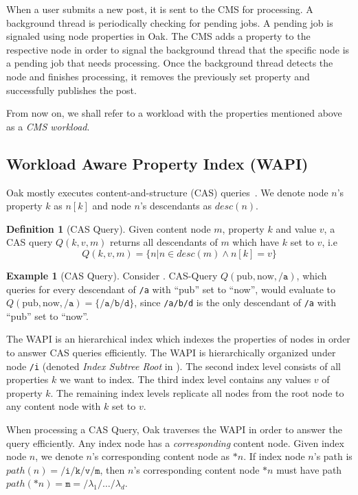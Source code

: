 \documentclass[abstracton,12pt]{scrartcl}
\theoremstyle{definition}
\newtheorem{definition}{Definition}
\newtheorem{example}{Example}
\begin{document}
When a user submits a new post, it is sent to the CMS for processing. A
background thread is periodically checking for pending jobs. A pending job is
signaled using node properties in Oak.
The CMS adds a property to the respective node  in
order to signal the background thread that the specific node is a pending job that needs
processing. Once the
background thread detects the node and finishes processing, it removes the
previously set property and
successfully publishes the post.

From now on, we shall refer to a workload with the properties mentioned above as
a \textit{CMS workload}.

\subsection{Workload Aware Property Index (WAPI)}
\label{sec:wapi}

Oak mostly executes content-and-structure (CAS) queries~\cite{CM15}.
We denote node $n$'s property $k$ as $n[k]$ and node $n$'s descendants as
$desc(n)$.

\begin{definition}[CAS Query]
  Given content node $m$, property $k$ and value $v$, a CAS query
  $Q(k,v,m)$ returns all descendants of $m$ which have $k$ set to $v$, i.e
  $$ Q(k,v,m) = \{ n | n \in desc(m) \land n[k] = v\} $$
\end{definition}

\begin{example}[CAS Query]
  Consider . CAS-Query $Q(\text{pub},\text{now},\texttt{/a})$,
  which queries for every descendant of \texttt{/a} with
  ``pub'' set to ``now'', would evaluate to $Q(\text{pub},\text{now},\texttt{/a}) = \{\texttt{/a/b/d}\}$,
  since \texttt{/a/b/d} is the only descendant of \texttt{/a} with ``pub'' set
  to ``now''.
  \label{ex:cas_query}
\end{example}

The WAPI is an hierarchical index which indexes the properties of nodes in order
to answer CAS queries efficiently.
The WAPI is hierarchically organized under node \texttt{/i} (denoted
\textit{Index Subtree Root} in ).
The second index level consists of all properties $k$ we want
to index. The third index level contains any values $v$ of property $k$.
The remaining index levels replicate all nodes from the root node to any
content node with $k$ set to $v$.

When processing a CAS Query, Oak traverses the WAPI in order to answer the query
efficiently. Any index node has a \textit{corresponding} content node.
Given index node $n$, we denote $n$'s corresponding content node as $*n$.
If index node $n$'s path is $path(n) = \texttt{/i/k/v/m}$, then $n$'s corresponding content
node $*n$ must have path $path(*n) = \texttt{m} = \texttt{/}\lambda_1\texttt{/}\dots\texttt{/}\lambda_d$.
\end{document}

